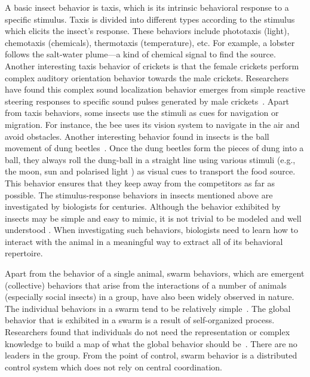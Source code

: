 A basic insect behavior is taxis, which is its intrinsic behavioral response to a specific stimulus. Taxis is divided into different types according to the stimulus which elicits the insect's response. These behaviors include phototaxis (light), chemotaxis (chemicals), thermotaxis (temperature), etc. For example, a lobster follows the salt-water plume---a kind of chemical signal to find the source. Another interesting taxis behavior of crickets is that the female crickets perform complex auditory orientation behavior towards the male crickets. Researchers have found this complex sound localization behavior emerges from simple reactive steering responses to specific sound pulses generated by male crickets~\cite{Hedwig2004}. Apart from taxis behaviors, some insects use the stimuli as cues for navigation or migration. For instance, the bee uses its vision system to navigate in the air and avoid obstacles. Another interesting behavior found in insects is the ball movement of dung beetles~\cite{Emily_2012}. Once the dung beetles form the pieces of dung into a ball, they always roll the dung-ball in a straight line using various stimuli (e.g., the moon, sun and polarised light \cite{Byrne_2003, Matthews_1962}) as visual cues to transport the food source. This behavior ensures that they keep away from the competitors as far as possible. The stimulus-response behaviors in insects mentioned above are investigated by biologists for centuries. Although the behavior exhibited by insects may be simple and easy to mimic, it is not trivial to be modeled and well understood \cite{Ignacio2009}. When investigating such behaviors, biologists need to learn how to interact with the animal in a meaningful way to extract all of its behavioral repertoire. 

Apart from the behavior of a single animal, swarm behaviors, which are emergent (collective) behaviors that arise from the interactions of a number of animals (especially social insects) in a group, have also been widely observed in nature. The individual behaviors in a swarm tend to be relatively simple~\cite{Camazine2001}. The global behavior that is exhibited in a swarm is a result of self-organized process. Researchers found that individuals do not need the representation or complex knowledge to build a map of what the global behavior should be~\cite{Garnier:SI:2007}. There are no leaders in the group. From the point of control, swarm behavior is a distributed control system which does not rely on central coordination.

